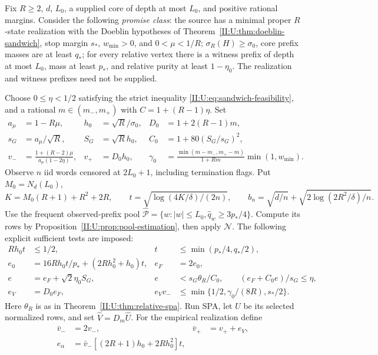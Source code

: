 \begin{theorem}
\label{II:U:thm:bounded-pool-learning}
Fix $R\ge2$, $d$, $L_0$, a supplied core of depth at most $L_0$,
and positive rational margins. Consider the following \emph{promise
class}: the source has a minimal proper $R$-state realization with
the Doeblin hypotheses of Theorem~\ref{II:U:thm:doeblin-sandwich},
stop margin $s_*$, $w_{\min}>0$, and $0<\mu<1/R$;
$\sigma_R(H)\ge\sigma_0$, core prefix masses are at least $q_*$;
for every relative vertex there is a witness prefix of depth at most
$L_0$, mass at least $p_*$, and relative purity at least $1-\eta_0$.
The realization and witness prefixes need not be supplied.

Choose $0\le\eta<1/2$ satisfying the strict inequality
\eqref{II:U:eq:sandwich-feasibility}, and a rational $m\in(m_-,m_+)$
with $C=1+(R-1)\eta$. Set
\begin{align*}
 a_\mu&=1-R\mu,& h_0&=\sqrt R/\sigma_0,& D_0&=1+2(R-1)m,\\
 s_G&=a_\mu/\sqrt R,& S_G&=\sqrt R h_0,
 & C_0&=1+80(S_G/s_G)^2,\\
 v_-&=\frac{1+(R-2)\mu}{a_\mu(1-2\eta)},&
 v_+&=D_0h_0,&
 \gamma_0&=\frac{\min(m-m_-,m_+-m)}{1+Rm}\min(1,w_{\min}).
\end{align*}
Observe $n$ iid words censored at $2L_0+1$, including termination
flags. Put $M_0=N_d(L_0)$,
\[
 K=M_0(R+1)+R^2+2R,\qquad
 t=\sqrt{\log(4K/\delta)/(2n)},\qquad
 b_n=\sqrt{d/n}+\sqrt{2\log(2R^2/\delta)/n}.
\]
Use the frequent observed-prefix pool
$\widehat{\mathcal P}=\{w:|w|\le L_0,\widehat q_w\ge3p_*/4\}$.
Compute its rows by Proposition~\ref{II:U:prop:pool-estimation}, then apply
$\mathcal N$. The following explicit sufficient tests are imposed:
\begin{align*}
 Rh_0t&\le1/2,& t&\le\min(p_*/4,q_*/2),\\
 e_0&=16Rh_0t/p_*+(2Rh_0^2+h_0)t,& e_F&=2e_0,\\
 e&=e_F+\sqrt2\eta_0S_G,&
 e&<s_G\theta_R/C_0,\qquad
 (e_F+C_0e)/s_G\le\eta,\\
 e_V&=D_0e_F,&
 e_Vv_-&\le\min\{1/2,\gamma_0/(8R),s_*/2\}.
\end{align*}
Here $\theta_R$ is as in Theorem~\ref{II:U:thm:relative-spa}.
Run SPA, let $\widehat U$ be its selected normalized rows, and set
$\widehat V=D_m\widehat U$. For the empirical realization define
\begin{align*}
 \bar v_-&=2v_-,&\bar v_+&=v_++e_V,\\
 e_\alpha&=\bar v_-[(2R+1)h_0+2Rh_0^2]t,\\

\end{align*}
\end{theorem}
